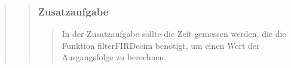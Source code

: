 \begin{quote}
\begin{quote}
\begin{quote}
			\end{quote}
			
			\subsubsection{Zusatzaufgabe}
			\begin{quote}
			
			In der Zusatzaufgabe sollte die Zeit gemessen werden, die die Funktion
			filterFIRDecim benötigt, um einen Wert der Ausgangsfolge zu berechnen. 
			
			\end{quote}
			
			\end{quote}%
		
\end{quote}%


